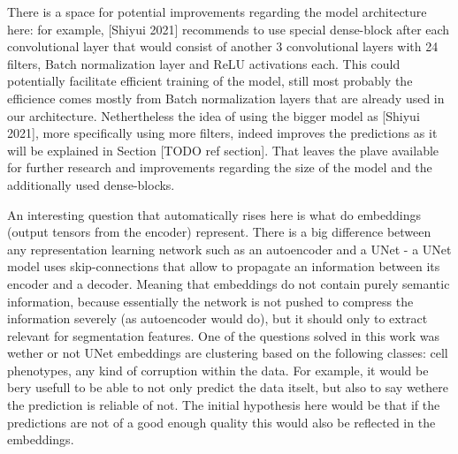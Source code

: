 There is a space for potential improvements regarding the model architecture here: for example, [Shiyui 2021] recommends to use special dense-block after each convolutional layer that would consist of another 3 convolutional layers with 24 filters, Batch normalization layer and ReLU activations each. This could potentially facilitate efficient training of the model, still most probably the efficience comes mostly from Batch normalization layers that are already used in our architecture. Nethertheless the idea of using the bigger model as [Shiyui 2021], more specifically using more filters, indeed improves the predictions as it will be explained in Section [TODO ref section]. That leaves the plave available for further research and improvements regarding the size of the model and the additionally used dense-blocks. 

An interesting question that automatically rises here is what do embeddings (output tensors from the encoder) represent. There is a big difference between any representation learning network such as an autoencoder and a UNet - a UNet model uses skip-connections that allow to propagate an information between its encoder and a decoder. Meaning that embeddings do not contain purely semantic information, because essentially the network is not pushed to compress the information severely (as autoencoder would do), but it should only to extract relevant for segmentation features. One of the questions solved in this work was wether or not UNet embeddings are clustering based on the following classes: cell phenotypes, any kind of corruption within the data. For example, it would be bery usefull to be able to not only predict the data itselt, but also to say wethere the prediction is reliable of not. The initial hypothesis here would be that if the predictions are not of a good enough quality this would also be reflected in the embeddings. 